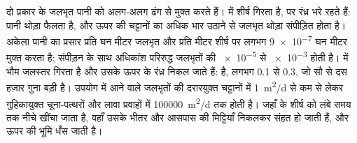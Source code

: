 दो प्रकार के जलभृत पानी को अलग-अलग ढंग से मुक्त करते हैं।  में
शीर्ष गिरता है, पर रंध्र भरे रहते हैं: पानी थोड़ा फैलता है,
और ऊपर की चट्टानों का अधिक भार उठाने से जलभृत थोड़ा संपीड़ित होता है।
अकेला पानी का प्रसार प्रति घन मीटर जलभृत और प्रति मीटर शीर्ष पर लगभग
\num{9e-7} घन मीटर मुक्त करता है; संपीड़न के साथ अधिकांश परिरुद्ध
जलभृतों की  \num{e-5} से \num{e-3} होती है।  में
भौम जलस्तर गिरता है और उसके ऊपर के रंध्र निकल जाते हैं: 
 है, लगभग 0.1 से 0.3, जो सौ से दस हज़ार गुना बड़ी है।
उपयोग में आने वाले जलभृतों की  दरारयुक्त चट्टानों में
\qty{1}{m^2/d} से कम से लेकर गुहिकायुक्त चूना-पत्थरों और लावा प्रवाहों में
\qty{100000}{m^2/d} तक होती है। जहाँ  के शीर्ष को लंबे समय तक
नीचे खींचा जाता है, वहाँ उसके भीतर और आसपास की मिट्टियाँ निकलकर संहत हो जाती हैं,
और ऊपर की भूमि धँस जाती है।

